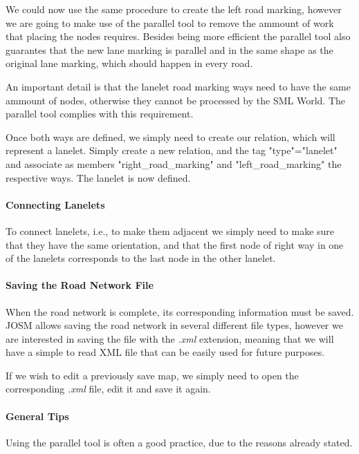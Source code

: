 We could now use the same procedure to create the left road marking, however we are going to make use of the parallel tool to remove the ammount of work that placing the nodes requires. Besides being more efficient the parallel tool also guarantes that the new lane marking is parallel and in the same shape as the original lane marking, which should happen in every road.

An important detail is that the lanelet road marking ways need to have the same ammount of nodes, otherwise they cannot be processed by the SML World. The parallel tool complies with this requirement.

Once both ways are defined, we simply need to create our relation, which will represent a lanelet. Simply create a new relation, and the tag "type"="lanelet" and associate as members "right\_road\_marking" and "left\_road\_marking" the respective ways. The lanelet is now defined. 

\paragraph{Connecting Lanelets}

To connect lanelets, i.e., to make them adjacent we simply need to make sure that they have the same orientation, and that the first node of right way in one of the lanelets corresponds to the last node in the other lanelet.


\paragraph{Saving the Road Network File}

When the road network is complete, its corresponding information must be saved. JOSM allows saving the road network in several different file types, however we are interested in saving the file with the \textit{.xml} extension, meaning that we will have a simple to read XML file that can be easily used for future purposes.

If we wish to edit a previously save map, we simply need to open the corresponding \textit{.xml} file, edit it and save it again.

\paragraph{General Tips}

Using the parallel tool is often a good practice, due to the reasons already stated.

